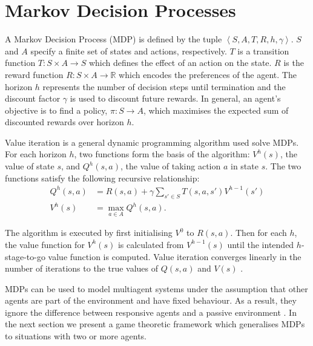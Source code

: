 \section{Markov Decision Processes}
\label{sec:mdp}

A Markov Decision Process (MDP) \cite{Howard_1960} is defined by the tuple
$ \left\langle S, A, T, R, h, \gamma \right\rangle$. $S$ and $A$ 
specify a finite set of states and actions, respectively.
$T$ is a transition function $T : S \times A \rightarrow S$ which 
defines the effect of an action on the state. $R$ is the
reward function $R : S \times A \rightarrow \mathbb{R}$ which 
encodes the preferences of the agent. The horizon $h$ represents the 
number of decision steps until termination and the discount factor $\gamma$ 
is used to discount future rewards. In general, an agent's objective is 
to find a policy, $\pi : S \rightarrow A$, which maximises the expected 
sum of discounted rewards over horizon $h$.

Value iteration \cite{Bellman_1957} is a general dynamic programming 
algorithm used solve MDPs. For each horizon $h$, two functions form 
the basis of the algorithm: $V^{h}(s)$, the value of state $s$, and 
$Q^{h}(s, a)$, the value of taking action $a$ in state $s$. The two 
functions satisfy the following recursive relationship:
\begin{align}
  Q^{h}(s, a) &= R(s, a) + \gamma \sum_{s' \in S} T(s, a, s') V^{h-1}(s') \\
  V^{h}(s) &= \max_{a \in A} Q^{h}(s, a).
\end{align}

The algorithm is executed by first initialising $V^{0}$  to $R(s, a)$. 
Then for each $h$, the value function for $V^{h}(s)$ is calculated from $V^{h-1}(s)$
until the intended $h$-stage-to-go value function is computed.
Value iteration converges linearly in the number of iterations to the true
values of $Q(s, a)$ and $V(s)$ \cite{Bertsekas_1987}.

MDPs can be used to model multiagent systems under the assumption 
that other agents are part of the environment and have fixed behaviour. 
As a result, they ignore the difference between responsive agents and 
a passive environment \cite{Hu_ICML_1998}. In the next section we 
present a game theoretic framework which generalises MDPs to 
situations with two or more agents.